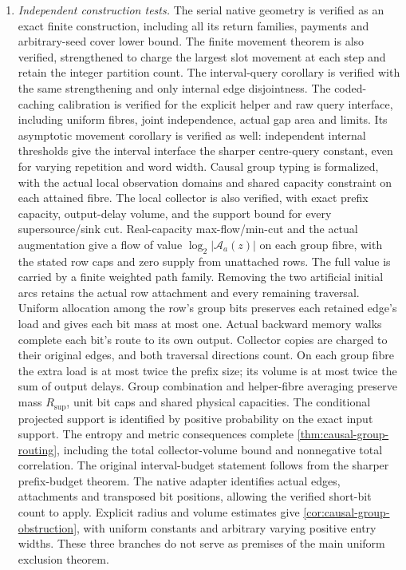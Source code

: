 \begin{enumerate}
\item \emph{Independent construction tests.}
The serial native geometry is verified as an exact finite construction,
including all its return families, payments and arbitrary-seed cover
lower bound. The finite movement theorem is also verified, strengthened
to charge the largest slot movement at each step and retain the integer
partition count. The interval-query corollary is verified with the same
strengthening and only internal edge disjointness. The coded-caching
calibration is verified for the explicit helper and raw query interface,
including uniform fibres, joint independence, actual gap area and limits.
Its asymptotic movement corollary is verified as well: independent
internal thresholds give the interval interface the sharper centre-query
constant, even for varying repetition and word width. Causal group typing
is formalized, with the actual local observation domains and shared
capacity constraint on each attained fibre. The local collector is also
verified, with exact prefix capacity, output-delay volume, and the support
bound for every supersource/sink cut. Real-capacity max-flow/min-cut and
the actual augmentation give a flow of value $\log_2|\mathcal A_a(z)|$
on each group fibre, with the stated row caps and zero supply from unattached rows.
The full value is carried by a finite weighted path family. Removing
the two artificial initial arcs retains the actual row attachment and every
remaining traversal. Uniform allocation among the row's group bits preserves
each retained edge's load and gives each bit mass at most one. Actual
backward memory walks complete each bit's route to its own output.
Collector copies are charged to their original edges, and both traversal
directions count. On each group fibre the extra load is at most twice the
prefix size; its volume is at most twice the sum of output delays. Group
combination and helper-fibre averaging preserve mass $R_{\mathrm{sup}}$,
unit bit caps and shared physical capacities. The conditional projected
support is identified by positive probability on the exact input support.
The entropy and metric consequences complete \cref{thm:causal-group-routing},
including the total collector-volume bound and nonnegative total correlation.
The original interval-budget statement follows from the sharper prefix-budget
theorem. The native adapter identifies actual edges, attachments and
transposed bit positions, allowing the verified short-bit count to apply.
Explicit radius and volume estimates give \cref{cor:causal-group-obstruction},
with uniform constants and arbitrary varying positive entry widths.
These three branches do not serve as premises of the main uniform
exclusion theorem.
\end{enumerate}

